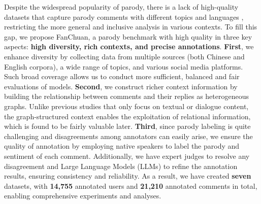 Despite the widespread popularity of parody, there is a lack of high-quality datasets that capture parody comments with different topics and languages \citep{parody_dataset}, restricting the more general and inclusive analysis in various contexts. To fill this gap, we propose FanChuan, a parody benchmark with high quality in three key aspects: \textbf{high diversity, rich contexts, and precise annotations}. \textbf{First}, we enhance diversity by collecting data from multiple sources (both Chinese and English corpora), a wide range of topics, and various social media platforms. Such broad coverage allows us to conduct more sufficient, balanced and fair evaluations of models. \textbf{Second}, we construct richer context information by building the relationship between comments and their replies as heterogeneous graphs. Unlike previous studies that only focus on textual \citep{text_zhang} or dialogue \citep{dialogue_bamman,dialogue_wang} content, the graph-structured context enables the exploitation of relational information, which is found to be fairly valuable later. \textbf{Third}, since parody labeling is quite challenging and disagreements among annotators can easily arise, we ensure the quality of annotation by employing native speakers to label the parody and sentiment of each comment. Additionally, we have expert judges to resolve any disagreement and Large Language Models (LLMs) to refine the annotation results, ensuring consistency and reliability. As a result, we have created \textbf{seven} datasets, with \textbf{14,755} annotated users and \textbf{21,210} annotated comments in total, enabling comprehensive experiments and analyses. 

